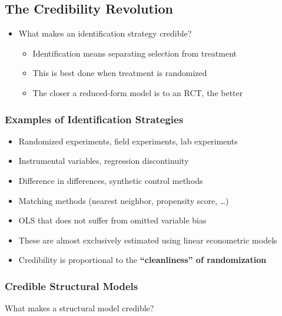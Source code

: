 \documentclass[11pt]{article}
\begin{document}
\subsection{The Credibility Revolution}
\label{sec:org02144d4}

\begin{itemize}
\item What makes an identification strategy credible?
\begin{itemize}
\item Identification means separating selection from treatment
\item This is best done when treatment is randomized
\item The closer a reduced-form model is to an RCT, the better
\end{itemize}
\end{itemize}

\subsubsection{Examples of Identification Strategies}
\label{sec:orgf0e9dc6}

\begin{itemize}
\item Randomized experiments, field experiments, lab experiments
\item Instrumental variables, regression discontinuity
\item Difference in differences, synthetic control methods
\item Matching methods (nearest neighbor, propensity score, \ldots{})
\item OLS that does not suffer from omitted variable bias
\item These are almost exclusively estimated using linear econometric models
\item Credibility is proportional to the \textbf{``cleanliness'' of randomization}
\end{itemize}

\subsubsection{Credible Structural Models}
\label{sec:org21c1088}

What makes a structural model credible?
\end{document}
